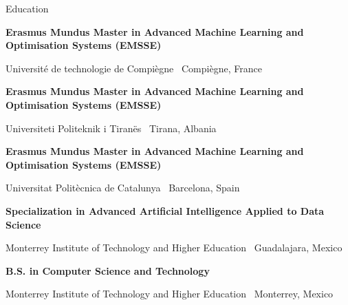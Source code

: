 \begin{rubric}{Education}

\entry*[05/2025 -- Current]
  \textbf{Erasmus Mundus Master in Advanced Machine Learning and Optimisation Systems (EMSSE)}\par
  Universit{\'e} de technologie de Compi{\`e}gne \textbar\ Compi{\`e}gne, France

\entry*[03/2025 -- 06/2025]
  \textbf{Erasmus Mundus Master in Advanced Machine Learning and Optimisation Systems (EMSSE)}\par
  Universiteti Politeknik i Tiran{\"e}s \textbar\ Tirana, Albania

\entry*[09/2024 -- 01/2025]
  \textbf{Erasmus Mundus Master in Advanced Machine Learning and Optimisation Systems (EMSSE)}\par
  Universitat Polit{\`e}cnica de Catalunya \textbar\ Barcelona, Spain

\entry*[08/2023 -- 12/2024]
  \textbf{Specialization in Advanced Artificial Intelligence Applied to Data Science}\par
  Monterrey Institute of Technology and Higher Education \textbar\ Guadalajara, Mexico

\entry*[08/2021 -- 06/2024]
  \textbf{B.S. in Computer Science and Technology}\par
  Monterrey Institute of Technology and Higher Education \textbar\ Monterrey, Mexico

\end{rubric}
